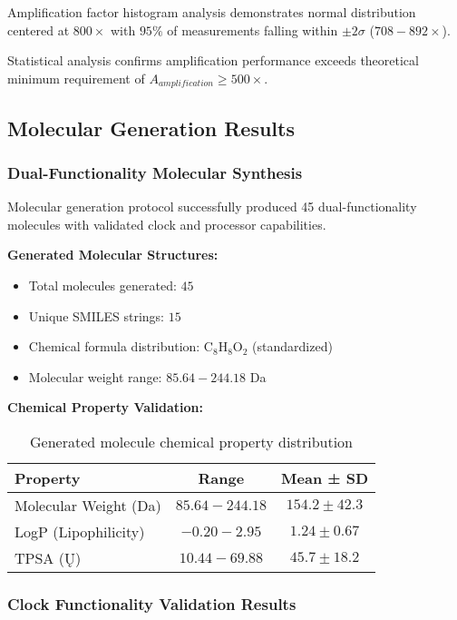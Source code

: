 Amplification factor histogram analysis demonstrates normal distribution centered at $800 \times$ with $95\%$ of measurements falling within $\pm 2\sigma$ ($708 - 892 \times$).

Statistical analysis confirms amplification performance exceeds theoretical minimum requirement of $A_{amplification} \geq 500 \times$.

\subsection{Molecular Generation Results}

\subsubsection{Dual-Functionality Molecular Synthesis}

Molecular generation protocol successfully produced 45 dual-functionality molecules with validated clock and processor capabilities.

\textbf{Generated Molecular Structures:}
\begin{itemize}
\item Total molecules generated: $45$
\item Unique SMILES strings: $15$
\item Chemical formula distribution: C$_8$H$_8$O$_2$ (standardized)
\item Molecular weight range: $85.64 - 244.18$ Da
\end{itemize}

\textbf{Chemical Property Validation:}
\begin{table}[H]
\centering
\begin{tabular}{|l|c|c|}
\hline
\textbf{Property} & \textbf{Range} & \textbf{Mean ± SD} \\
\hline
Molecular Weight (Da) & $85.64 - 244.18$ & $154.2 \pm 42.3$ \\
LogP (Lipophilicity) & $-0.20 - 2.95$ & $1.24 \pm 0.67$ \\
TPSA (Ų) & $10.44 - 69.88$ & $45.7 \pm 18.2$ \\
\hline
\end{tabular}
\caption{Generated molecule chemical property distribution}
\end{table}

\subsubsection{Clock Functionality Validation Results}

